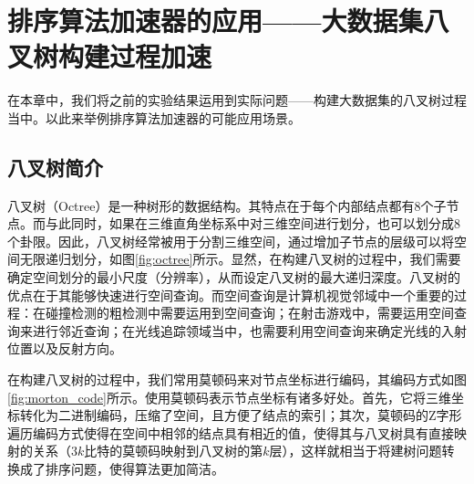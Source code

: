 
\chapter{排序算法加速器的应用——大数据集八叉树构建过程加速}

在本章中，我们将之前的实验结果运用到实际问题——构建大数据集的八叉树过程当中。以此来举例排序算法加速器的可能应用场景。

\section{八叉树简介}






八叉树（Octree）是一种树形的数据结构。其特点在于每个内部结点都有8个子节点。而与此同时，如果在三维直角坐标系中对三维空间进行划分，也可以划分成8个卦限。因此，八叉树经常被用于分割三维空间，通过增加子节点的层级可以将空间无限递归划分\cite{meagher1980octree}，如图\ref{fig:octree}所示。显然，在构建八叉树的过程中，我们需要确定空间划分的最小尺度（分辨率），从而设定八叉树的最大递归深度。八叉树的优点在于其能够快速进行空间查询。而空间查询是计算机视觉邻域中一个重要的过程：在碰撞检测的粗检测中需要运用到空间查询；在射击游戏中，需要运用空间查询来进行邻近查询；在光线追踪领域当中，也需要利用空间查询来确定光线的入射位置以及反射方向。

在构建八叉树的过程中，我们常用莫顿码\cite{morton1966computer}来对节点坐标进行编码，其编码方式如图\ref{fig:morton_code}所示。使用莫顿码表示节点坐标有诸多好处。首先，它将三维坐标转化为二进制编码，压缩了空间，且方便了结点的索引；其次，莫顿码的Z字形遍历编码方式使得在空间中相邻的结点具有相近的值，使得其与八叉树具有直接映射的关系（$3k$比特的莫顿码映射到八叉树的第$k$层\cite{karras2012maximizing}），这样就相当于将建树问题转换成了排序问题，使得算法更加简洁。

